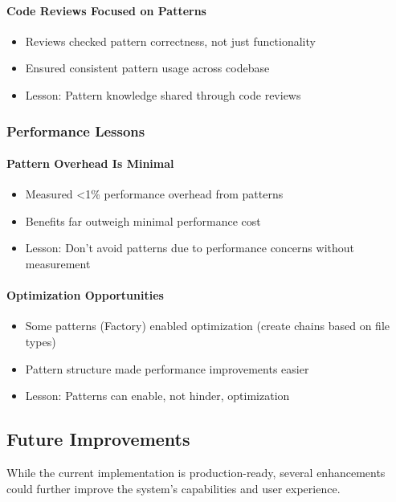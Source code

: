 \documentclass[11pt, a4paper]{article}
\theoremstyle{plain}
\theoremstyle{definition}
\begin{document}
\paragraph{Code Reviews Focused on Patterns}
\begin{itemize}
    \item Reviews checked pattern correctness, not just functionality
    \item Ensured consistent pattern usage across codebase
    \item Lesson: Pattern knowledge shared through code reviews
\end{itemize}

\subsubsection{Performance Lessons}

\paragraph{Pattern Overhead Is Minimal}
    \begin{itemize}
    \item Measured <1\% performance overhead from patterns
    \item Benefits far outweigh minimal performance cost
    \item Lesson: Don't avoid patterns due to performance concerns without measurement
    \end{itemize}

\paragraph{Optimization Opportunities}
\begin{itemize}
    \item Some patterns (Factory) enabled optimization (create chains based on file types)
    \item Pattern structure made performance improvements easier
    \item Lesson: Patterns can enable, not hinder, optimization
\end{itemize}

\subsection{Future Improvements}

While the current implementation is production-ready, several enhancements could further improve the system's capabilities and user experience.
\end{document}
